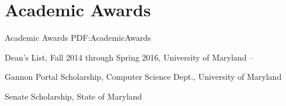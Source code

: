 
\section
{Academic Awards}
{Academic Awards}
{PDF:AcademicAwards}

\BulletItem
Dean's List,
Fall 2014 through Spring 2016,
University of Maryland
\hfill
{} --

\Gap
\BulletItem
Gannon Portal Scholarship,
Computer Science Dept., 
University of Maryland
\hfill
{}

\Gap
\BulletItem
Senate Scholarship,
State of Maryland
\hfill
{}